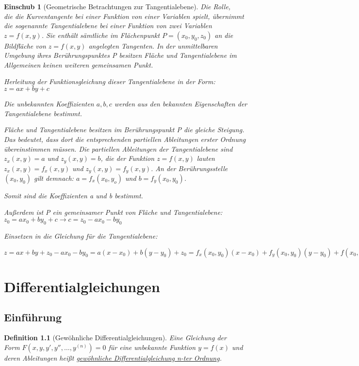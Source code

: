 \documentclass[12pt,a4paper]{scrreprt}
\newtheorem{defi}{Definition}[section]
\newtheorem*{einschub}{Einschub}
\begin{document}
	\begin{einschub}[Geometrische Betrachtungen zur Tangentialebene]
		Die Rolle, \\
		die die Kurventangente bei einer Funktion von einer Variablen spielt, übernimmt die sogenannte Tangentialebene bei einer Funktion von zwei Variablen $z=f(x,y)$. Sie enthält sämtliche im Flächenpunkt $P=(x_0,y_0,z_0)$ an die Bildfläche von $z=f(x,y)$ angelegten Tangenten. In der unmittelbaren Umgebung ihres Berührungspunktes P besitzen Fläche und Tangentialebene im Allgemeinen keinen weiteren gemeinsamen Punkt.

		Herleitung der Funktionsgleichung dieser Tangentialebene in der Form: $z=ax+by+c$

		Die unbekannten Koeffizienten $a,b,c$ werden aus den bekannten Eigenschaften der Tangentialebene bestimmt.

		Fläche und Tangentialebene besitzen im Berührungspunkt P die gleiche Steigung. Das bedeutet, dass dort die entsprechenden partiellen Ableitungen erster Ordnung über\-ein\-stimmen müssen. Die partiellen Ableitungen der Tangentialebene sind $z_x(x,y)=a$ und $z_y(x,y)=b$, die der Funktion $z=f(x,y)$ lauten $z_x(x,y)=f_x(x,y)$ und $z_y(x,y)=f_y(x,y)$. An der Berührungsstelle $(x_0,y_0)$ gilt demnach: $a=f_x(x_0,y_o)$ und $b=f_y(x_0,y_0)$.

		Somit sind die Koeffizienten a und b bestimmt.

		Außerdem ist P ein gemeinsamer Punkt von Fläche und Tangentialebene: $z_0=ax_0+by_0+c \to c=z_0-ax_0-by_0$

		Einsetzen in die Gleichung für die Tangentialebene:

		$z=ax+by+z_0-ax_0-by_0 = a(x-x_0)+b(y-y_0)+z_0=f_x(x_0,y_0)(x-x_0)+f_y(x_0,y_0)(y-y_0)+f(x_0,y_0)$
	\end{einschub}

	\chapter{Differentialgleichungen}
	\section{Einführung}

	\begin{defi}[Gewöhnliche Differentialgleichungen]
		Eine Gleichung der
		\\
		Form $F(x,y,y',y'',\dots,y^{(n)})=0$ für eine unbekannte Funktion $y=f(x)$ und deren Ableitungen heißt \underline{gewöhnliche Differentialgleichung n-ter Ordnung}.
	\end{defi}
\end{document}
